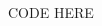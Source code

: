 \documentclass[twoside]{article}
\begin{document}
\begin{multicols*}{2}
    \tableofcontents
\end{multicols*}
CODE HERE
\end{document}
